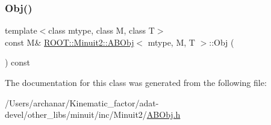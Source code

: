 \mbox{\label{classROOT_1_1Minuit2_1_1ABObj_a82bf2a4359c24b894e4e8990185432c1}} 
\subsubsection{\texorpdfstring{Obj()}{Obj()}\hspace{0.1cm}{\footnotesize\ttfamily [3/3]}}
{\footnotesize\ttfamily template$<$class mtype, class M, class T$>$ \\
const M\& \mbox{\hyperlink{classROOT_1_1Minuit2_1_1ABObj}{R\+O\+O\+T\+::\+Minuit2\+::\+A\+B\+Obj}}$<$ mtype, M, T $>$\+::Obj (\begin{DoxyParamCaption}{ }\end{DoxyParamCaption}) const\hspace{0.3cm}{\ttfamily [inline]}}



The documentation for this class was generated from the following file\+:\begin{DoxyCompactItemize}
\item 
/\+Users/archanar/\+Kinematic\+\_\+factor/adat-\/devel/other\+\_\+libs/minuit/inc/\+Minuit2/\mbox{\hyperlink{adat-devel_2other__libs_2minuit_2inc_2Minuit2_2ABObj_8h}{A\+B\+Obj.\+h}}\end{DoxyCompactItemize}
